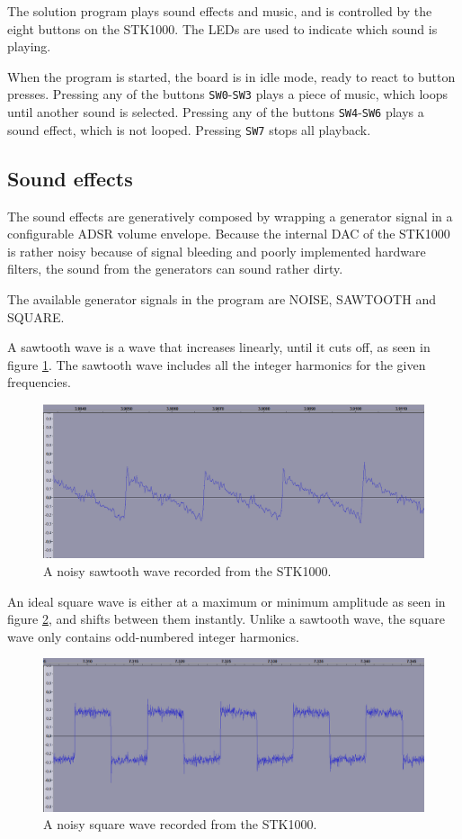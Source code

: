 The solution program plays sound effects and music, and is controlled by the eight buttons on the STK1000.
The LEDs are used to indicate which sound is playing.

When the program is started, the board is in idle mode, ready to react to button presses.
Pressing any of the buttons \texttt{SW0}-\texttt{SW3} plays a piece of music, which loops until another sound is selected.
Pressing any of the buttons \texttt{SW4}-\texttt{SW6} plays a sound effect, which is not looped.
Pressing \texttt{SW7} stops all playback.

\subsection{Sound effects}

The sound effects are generatively composed by wrapping a generator signal in a configurable ADSR volume envelope.
Because the internal DAC of the STK1000 is rather noisy because of signal bleeding and poorly implemented hardware filters, the sound from the generators can sound rather dirty.

The available generator signals in the program are NOISE, SAWTOOTH and SQUARE.

A sawtooth wave is a wave that increases linearly, until it cuts off, as seen in figure \ref{img-sw5zoom}.
The sawtooth wave includes all the integer harmonics for the given frequencies.
\begin{figure}[H]
	\includegraphics[width = \textwidth]{images/SW5zoom.png}
	\caption{A noisy sawtooth wave recorded from the STK1000.}
	\label{img-sw5zoom}
\end{figure}

An ideal square wave is either at a maximum or minimum amplitude as seen in figure \ref{img-sw4zoom}, and shifts between them instantly.
Unlike a sawtooth wave, the square wave only contains odd-numbered integer harmonics.
\begin{figure}[H]
	\includegraphics[width = \textwidth]{images/SW4zoom.png}
	\caption{A noisy square wave recorded from the STK1000.}
	\label{img-sw4zoom}
\end{figure}

